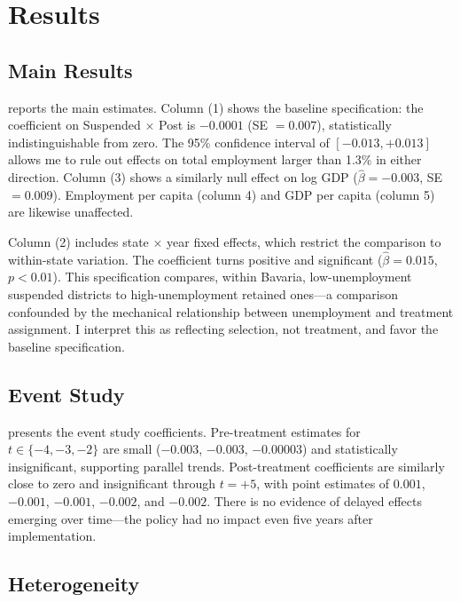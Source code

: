 \documentclass[12pt]{article}
\begin{document}
\section{Results}

\subsection{Main Results}

 reports the main estimates. Column (1) shows the baseline specification: the coefficient on Suspended $\times$ Post is $-0.0001$ (SE $= 0.007$), statistically indistinguishable from zero. The 95\% confidence interval of $[-0.013, +0.013]$ allows me to rule out effects on total employment larger than 1.3\% in either direction. Column (3) shows a similarly null effect on log GDP ($\hat{\beta} = -0.003$, SE $= 0.009$). Employment per capita (column 4) and GDP per capita (column 5) are likewise unaffected.

Column (2) includes state $\times$ year fixed effects, which restrict the comparison to within-state variation. The coefficient turns positive and significant ($\hat{\beta} = 0.015$, $p < 0.01$). This specification compares, within Bavaria, low-unemployment suspended districts to high-unemployment retained ones---a comparison confounded by the mechanical relationship between unemployment and treatment assignment. I interpret this as reflecting selection, not treatment, and favor the baseline specification.



\subsection{Event Study}

 presents the event study coefficients. Pre-treatment estimates for $t \in \{-4, -3, -2\}$ are small ($-0.003$, $-0.003$, $-0.00003$) and statistically insignificant, supporting parallel trends. Post-treatment coefficients are similarly close to zero and insignificant through $t = +5$, with point estimates of $0.001$, $-0.001$, $-0.001$, $-0.002$, and $-0.002$. There is no evidence of delayed effects emerging over time---the policy had no impact even five years after implementation.



\subsection{Heterogeneity}
\end{document}
